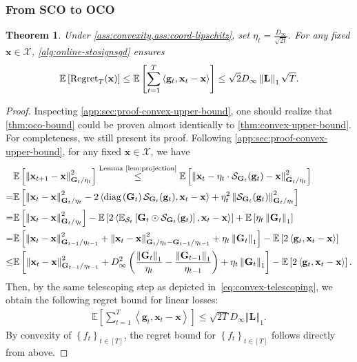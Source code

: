 \documentclass{article}
\newtheorem{thm}{Theorem}
\def \E {\mathbb{E}}
\def \x {\mathbf{x}}
\def \g {\mathbf{g}}
\def \SS {\mathcal{S}}
\def \Gb {\mathbf{G}}
\def \Lb {\mathbf{L}}
\def \X {\mathcal{X}}
\newcommand{\inner}[2]{\left\langle #1, #2 \right\rangle}
\newcommand{\norm}[1]{\left\Vert#1\right\Vert}
\newcommand{\diag}[1]{\textrm{diag}\left(#1\right)}
\newcommand{\sqbrac}[1]{\left[#1\right]}
\newcommand{\brac}[1]{\left(#1\right)}
\newcommand{\cbrac}[1]{\left\{#1\right\}}
\begin{document}
\subsubsection{From SCO to OCO\label{app:sec:sco2oco}}

\begin{thm}\label{thm:oco-bound-pseudo}
    Under \cref{ass:convexity,ass:coord-lipschitz}, set $\eta_t=\frac{D_\infty}{\sqrt{2t}}$. For any fixed $\x\in\X$, \cref{alg:online-stosignsgd} ensures 
    \begin{align*}
        \E\sqbrac{\textnormal{Regret}_T(\x)}\le\E\sqbrac{\sum_{t=1}^T\inner{\g_t}{\x_t-\x}}\le\sqrt{2}D_\infty\norm{\Lb}_1\sqrt{T}.
    \end{align*}
\end{thm}

\begin{proof}
    Inspecting \cref{app:sec:proof-convex-upper-bound}, one should realize that \cref{thm:oco-bound} could be proven almost identically to \cref{thm:convex-upper-bound}. For completeness, we still present its proof. Following \cref{app:sec:proof-convex-upper-bound}, for any fixed $\x\in\X$, we have
\begin{align*}
    &\E\sqbrac{\norm{\x_{t+1}-\x}^2_{\Gb_t/\eta_t}}\overset{\text{Lemma~\ref{lem:projection}}}{\le}\E\sqbrac{\norm{\x_{t}-\eta_t\cdot\SS_{\Gb_t}(\g_t)-\x}^2_{\Gb_t/\eta_t}}\\=&\E\sqbrac{\norm{\x_{t}-\x}^2_{\Gb_t/\eta_t}-2\inner{\diag{\Gb_t}\SS_{\Gb_t}(\g_t)}{\x_{t}-\x}+\eta_t^2\norm{\SS_{\Gb_t}(\g_t)}^2_{\Gb_t/\eta_t}}\\=&\E\sqbrac{\norm{\x_{t}-\x}^2_{\Gb_t/\eta_t}}-\E\sqbrac{2\inner{\E_{\SS_t}\sqbrac{\Gb_t\odot\SS_{\Gb_t}(\g_t)}}{\x_{t}-\x}}+\E\sqbrac{\eta_t\norm{\Gb_t}_1}\\=&\E\sqbrac{\norm{\x_{t}-\x}^2_{\Gb_{t-1}/\eta_{t-1}}+\norm{\x_{t}-\x}^2_{\Gb_t/\eta_t-\Gb_{t-1}/\eta_{t-1}}+\eta_t\norm{\Gb_t}_1}-\E\sqbrac{2\inner{\g_t}{\x_{t}-\x}}\\\le&\E\sqbrac{\norm{\x_{t}-\x}^2_{\Gb_{t-1}/\eta_{t-1}}+D_\infty^2\brac{\frac{\norm{\Gb_t}_1}{\eta_t}-\frac{\norm{\Gb_{t-1}}_1}{\eta_{t-1}}}+\eta_t\norm{\Gb_t}_1}-\E\sqbrac{2\inner{\g_t}{\x_{t}-\x}}.
\end{align*}
Then, by the same telescoping step as depicted in~\eqref{eq:convex-telescoping}, we obtain the following regret bound for linear losses:
\begin{align*}
    \E\sqbrac{\sum_{t=1}^T\inner{\g_t}{\x_t-\x}}\le\sqrt{2T}D_\infty\norm{\Lb}_1.
\end{align*}
By convexity of $\cbrac{f_t}_{t\in[T]}$, the regret bound for $\cbrac{f_t}_{t\in[T]}$ follows directly from above.
\end{proof}
\end{document}
